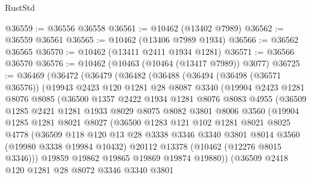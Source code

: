 \begin{lexlean}{RustStd}
\begin{coremodule}
@36559 := @36556 @36558
@36561 := @10462 (@13402 @7989)
@36562 := @36559 @36561
@36565 := @10462 (@13406 @7989 @1934)
@36566 := @36562 @36565
@36570 := @10462 (@13411 @2411 @1934 @1281)
@36571 := @36566 @36570
@36576 := @10462 (@10463 (@10464 (@13417 @7989)) @3077)
@36725 := @36469
    (@36472
      (@36479
        (@36482
          (@36488
            (@36494
              (@36498 (@36571 @36576))
              (@19943
                @2423
                @120
                @1281
                @28
                @8087
                @3340
                (@19904
                  @2423
                  @1281
                  @8076
                  @8085
                  (@36500
                    @1357
                    @2422
                    @1934
                    @1281
                    @8076
                    @8083
                    @4955
                    (@36509
                      @1285
                      @2421
                      @1281
                      @1933
                      @8029
                      @8075
                      @8082
                      @3801
                      @8006
                      @3560
                      (@19904
                        @1285
                        @1281
                        @8021
                        @8027
                        (@36500
                          @1283
                          @121
                          @102
                          @1281
                          @8021
                          @8025
                          @4778
                          (@36509
                            @118
                            @120
                            @13
                            @28
                            @3338
                            @3346
                            @3340
                            @3801
                            @8014
                            @3560
                            (@19980 @3338 @19984 @10432)
                            @20112
                            @13378
                            (@10462 (@12276 @8015 @3346)))
                          @19859
                          @19862
                          @19865
                          @19869
                          @19874
                          @19880))
                      (@36509
                        @2418
                        @120
                        @1281
                        @28
                        @8072
                        @3346
                        @3340
                        @3801

\end{coremodule}
\end{lexlean}
